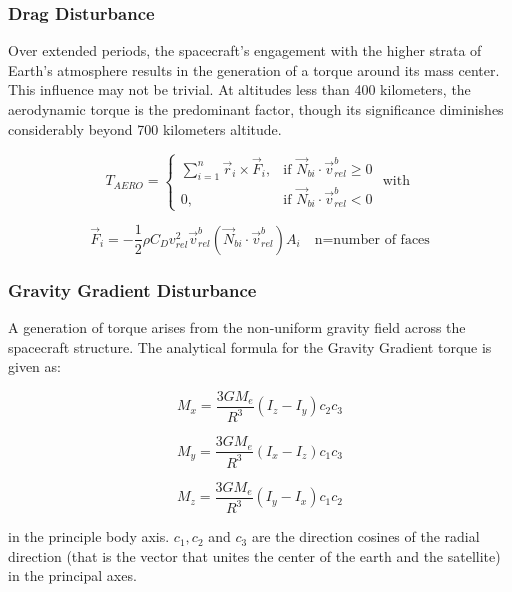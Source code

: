 \subsubsection{Drag Disturbance}
\label{subsubsec:dist_drag}

Over extended periods, the spacecraft's engagement with the higher strata of Earth's atmosphere results in the generation of a torque around its mass center. This influence may not be trivial. At altitudes less than 400 kilometers, the aerodynamic torque is the predominant factor, though its significance diminishes considerably beyond 700 kilometers altitude.

\[
T_{AERO} =
\begin{cases}
	\sum_{i=1}^{n} \vec{r}_i \times \vec{F}_i, & \text{if } \vec{N}_{bi} \cdot \vec{v}^{b}_{rel} \geq 0 \\
	0, & \text{if } \vec{N}_{bi} \cdot \vec{v}^{b}_{rel} < 0
\end{cases}
\text{ with }
\]

\[
\vec{F}_i = -\frac{1}{2} \rho C_D v_{rel}^2 \vec{v}_{rel}^{b} (\vec{N}_{bi} \cdot \vec{v}_{rel}^{b}) A_i \quad \text{n=number of faces}
\]


\subsubsection{Gravity Gradient Disturbance}

A generation of torque arises from the non-uniform gravity field across the spacecraft structure. The analytical formula for the Gravity Gradient torque is given as:

\[
M_x = \frac{3G M_e}{R^3} (I_z - I_y) c_2 c_3
\]

\[
M_y = \frac{3G M_e}{R^3} (I_x - I_z) c_1 c_3
\]

\[
M_z = \frac{3G M_e}{R^3} (I_y - I_x) c_1 c_2
\]

in the principle body axis. \( c_1, c_2 \) and \( c_3 \) are the direction cosines of the radial direction (that is the vector that unites the center of the earth and the satellite) in the principal axes.


\label{subsubsec:dist_GG}
